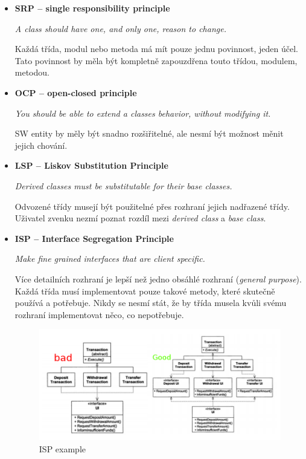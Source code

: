 \documentclass{szzclass}
\begin{document}
\begin{itemize}
      \item \textbf{SRP -- single responsibility principle}
      
      \textit{A class should have one, and only one, reason to change.}

      Každá třída, modul nebo metoda má mít pouze jednu povinnost, jeden účel.
      Tato povinnost by měla být kompletně zapouzdřena touto třídou, modulem, metodou.
      
      \item \textbf{OCP -- open-closed principle}
      
      \textit{You should be able to extend a classes behavior, without modifying it.}

      SW entity by měly být snadno rozšiřitelné, ale nesmí být možnost měnit jejich chování.
      
      \item \textbf{LSP -- Liskov Substitution Principle}
      
      \textit{Derived classes must be substitutable for their base classes.}

      Odvozené třídy musejí být použitelné přes rozhraní jejich nadřazené třídy.
      Uživatel zvenku nezmí poznat rozdíl mezi \textit{derived class} a \textit{base class}.
      
      \item \textbf{ISP -- Interface Segregation Principle}	
      
      \textit{Make fine grained interfaces that are client specific.}

      Více detailních rozhraní je lepší než jedno obsáhlé rozhraní (\textit{general purpose}).
      Každá třída musí implementovat pouze takové metody, které skutečně používá a potřebuje.
      Nikdy se nesmí stát, že by třída musela kvůli svému rozhraní implementovat něco, co nepotřebuje.
      \begin{figure}[ht]
            \centering
            \includegraphics[width=1\textwidth]{topics/bi-wsi-si-9/isp.png}
            \caption{ISP example}
      \end{figure}


\end{itemize}
\end{document}
